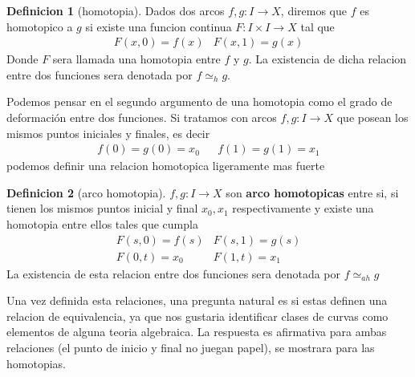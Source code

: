 \documentclass[letterpaper]{article}
\theoremstyle{definition}
\newtheorem{definicion}{Definicion}
\theoremstyle{plain}
\theoremstyle{plain}
\theoremstyle{remark}
\begin{document}
\begin{definicion}[homotopia]
  Dados dos arcos \(f,g : I \to X\), diremos que \(f\) es homotopico a
  \(g\) si existe una funcion continua \(F : I \times I \to X \) tal que
  \[ \begin{matrix}
      F (x, 0) = f(x) & F (x, 1) = g(x)
     \end{matrix}
  \]
  Donde \(F\) sera llamada una homotopia entre \(f\) y \(g\). La
  existencia de dicha relacion entre dos funciones sera denotada por \(f
  \simeq_{h} g\).
\end{definicion}
Podemos pensar en el segundo argumento de una homotopia como el grado de
deformación entre dos funciones.
Si tratamos con arcos \(f,g : I \to X\) que posean los mismos puntos
iniciales y finales, es decir
\[ \begin{matrix}
    f(0) = g(0) = x_0  & & f(1) = g(1) = x_1
   \end{matrix}
\]
podemos definir una relacion homotopica ligeramente mas fuerte
\begin{definicion}[arco homotopia]
  \(f,g : I \to X\) son \textbf{arco homotopicas} entre si, si tienen los mismos
  puntos inicial y final \(x_0, x_1\) respectivamente y existe una homotopia entre
  ellos tales que cumpla
  \[
    \begin{matrix}
      F(s,0) = f(s) & F(s,1) = g(s) \\
      F(0,t) = x_0  & F(1,t) = x_1
    \end{matrix}
  \]
  La existencia de esta relacion entre dos funciones sera denotada por
  \(f \simeq_{ah} g\)
\end{definicion}
Una vez definida esta relaciones, una pregunta natural es si estas definen
una relacion de equivalencia, ya que nos gustaria identificar clases de
curvas como elementos de alguna teoria algebraica. La respuesta es
afirmativa para ambas relaciones (el punto de inicio y final no juegan
papel), se mostrara para las homotopias.
\end{document}
